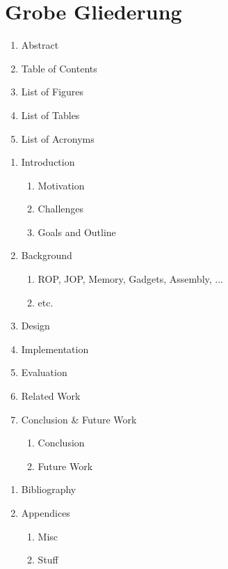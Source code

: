 \chapter{Grobe Gliederung}

\begin{enumerate}[label={}, leftmargin=0.5cm]
	\item Abstract
	\item Table of Contents
	\item List of Figures
	\item List of Tables
	\item List of Acronyms
\end{enumerate}

\begin{enumerate}
\renewcommand{\labelenumi}{\arabic{enumi}}
\renewcommand{\labelenumii}{\arabic{enumi}.\arabic{enumii}}
\renewcommand{\labelenumiii}{\arabic{enumi}.\arabic{enumii}.\arabic{enumiii}}
	\item Introduction
		\begin{enumerate}
			\item Motivation
			\item Challenges
			\item Goals and Outline
		\end{enumerate}
	\item Background
	\begin{enumerate}
		\item ROP, JOP, Memory, Gadgets, Assembly, ...
		\item etc.
	\end{enumerate} 
	\item Design
	\item Implementation
	\item Evaluation
	\item Related Work
	\item Conclusion \& Future Work
	\begin{enumerate}
		\item Conclusion
		\item Future Work
	\end{enumerate}
\end{enumerate}

\begin{enumerate}[label={}, leftmargin=0.5cm]
	\item Bibliography
	\item Appendices
	\begin{enumerate}[label=\Alph*, leftmargin=35pt]
		\item Misc
		\item Stuff
	\end{enumerate}
\end{enumerate}